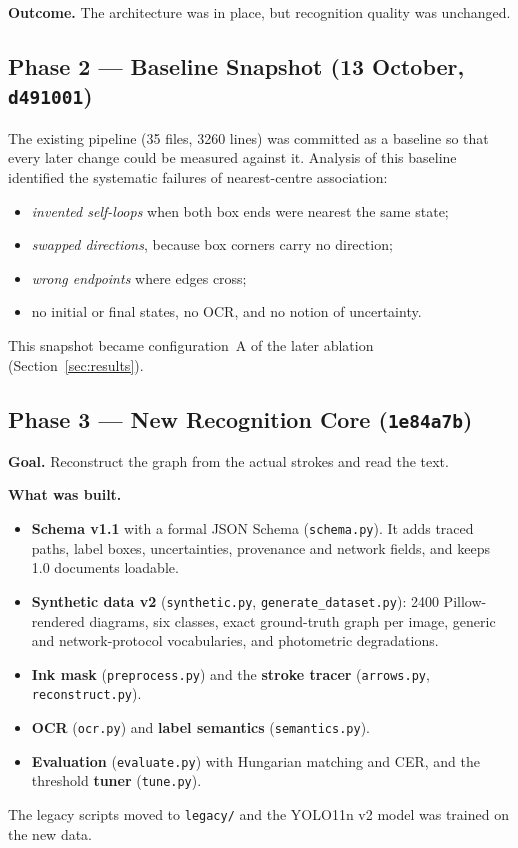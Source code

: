 \documentclass[journal,10pt]{IEEEtran}
\newcommand{\code}[1]{\texttt{#1}}
\begin{document}
\textbf{Outcome.} The architecture was in place, but recognition quality was unchanged.

\subsection{Phase 2 --- Baseline Snapshot (13 October, \code{d491001})}
The existing pipeline (35 files, 3260 lines) was committed as a baseline so that every
later change could be measured against it. Analysis of this baseline identified the
systematic failures of nearest-centre association:
\begin{itemize}
\item \emph{invented self-loops} when both box ends were nearest the same state;
\item \emph{swapped directions}, because box corners carry no direction;
\item \emph{wrong endpoints} where edges cross;
\item no initial or final states, no OCR, and no notion of uncertainty.
\end{itemize}
This snapshot became configuration~A of the later ablation (Section~\ref{sec:results}).

\subsection{Phase 3 --- New Recognition Core (\code{1e84a7b})}
\textbf{Goal.} Reconstruct the graph from the actual strokes and read the text.

\textbf{What was built.}
\begin{itemize}
\item \textbf{Schema v1.1} with a formal JSON Schema (\code{schema.py}). It adds traced
paths, label boxes, uncertainties, provenance and network fields, and keeps 1.0 documents
loadable.
\item \textbf{Synthetic data v2} (\code{synthetic.py}, \code{generate\_dataset.py}):
2400 Pillow-rendered diagrams, six classes, exact ground-truth graph per image, generic
and network-protocol vocabularies, and photometric degradations.
\item \textbf{Ink mask} (\code{preprocess.py}) and the \textbf{stroke tracer}
(\code{arrows.py}, \code{reconstruct.py}).
\item \textbf{OCR} (\code{ocr.py}) and \textbf{label semantics} (\code{semantics.py}).
\item \textbf{Evaluation} (\code{evaluate.py}) with Hungarian matching and CER, and the
threshold \textbf{tuner} (\code{tune.py}).
\end{itemize}
The legacy scripts moved to \code{legacy/} and the YOLO11n v2 model was trained on the
new data.
\end{document}

